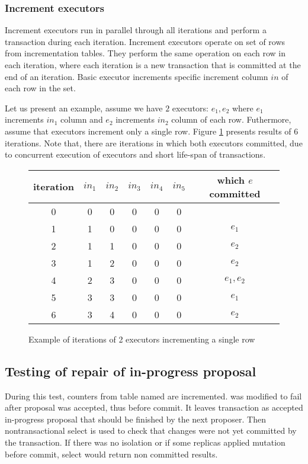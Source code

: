 \subsubsection{Increment executors}
Increment executors run in parallel through all iterations and perform a transaction during each iteration.
Increment executors operate on set of rows from incrementation tables. They perform the same operation on each row in each iteration, where each iteration is a new transaction that is committed at the end of an iteration. 
Basic executor increments specific increment column $in$ of each row in the set.

Let us present an example, assume we have $2$ executors: $e_1, e_2$ where $e_1$ increments $in_1$ column and $e_2$ increments $in_2$ column of each row. Futhermore, assume that executors increment only a single row. Figure \ref{fig:executorsExample} presents results of $6$ iterations. Note that, there are iterations in which both executors committed, due to concurrent execution of executors and short life-span of transactions.


\begin{figure}[h]
\centering
\begin{tabular}{c||c|c|c|c|c|c}
        \toprule
        iteration & $in_{1}$ & $in_{2}$ & $in_{3}$ & $in_{4}$ & $in_{5}$ & which $e$ committed \\ \midrule
        0 &         0        & 0        & 0        &  0       & 0        &    \\
        1 &         1        & 0        & 0        &  0       & 0        &   $e_1$ \\ 
        2 &         1        & 1        & 0        &  0       & 0        &   $e_2$ \\ 
        3 &         1        & 2        & 0        &  0       & 0        &   $e_2$ \\ 
        4 &         2        & 3        & 0        &  0       & 0        &   $e_1, e_2$ \\ 
        5 &         3        & 3        & 0        &  0       & 0        &   $e_1$ \\ 
        6 &         3        & 4        & 0        &  0       & 0        &   $e_2$ \\  \bottomrule
      \end{tabular}
      \caption{Example of iterations of 2 executors incrementing a single row}
  \label{fig:executorsExample}
\end{figure}

\subsection{Testing of repair of in-progress proposal}
 During this test, counters from table named  are incremented. 
 \mpt was modified to fail after proposal was accepted, thus before commit. It leaves transaction as accepted in-progress proposal that should be finished by the next proposer. 
 Then nontransactional select is used to check that changes were not yet committed by the transaction. If there was no isolation or if some replicas applied mutation before commit, select would return non committed results. 

